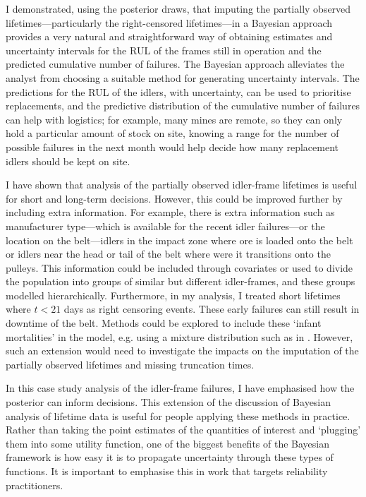 I demonstrated, using the posterior draws, that imputing the partially observed lifetimes---particularly the right-censored lifetimes---in a Bayesian approach provides a very natural and straightforward way of obtaining estimates and uncertainty intervals for the RUL of the frames still in operation and the predicted cumulative number of failures. The Bayesian approach alleviates the analyst from choosing a suitable method for generating uncertainty intervals. The predictions for the RUL of the idlers, with uncertainty, can be used to prioritise replacements, and the predictive distribution of the cumulative number of failures can help with logistics; for example, many mines are remote, so they can only hold a particular amount of stock on site, knowing a range for the number of possible failures in the next month would help decide how many replacement idlers should be kept on site.

I have shown that analysis of the partially observed idler-frame lifetimes is useful for short and long-term decisions. However, this could be improved further by including extra information. For example, there is extra information such as manufacturer type---which is available for the recent idler failures---or the location on the belt---idlers in the impact zone where ore is loaded onto the belt or idlers near the head or tail of the belt where were it transitions onto the pulleys. This information could be included through covariates or used to divide the population into groups of similar but different idler-frames, and these groups modelled hierarchically. Furthermore, in my analysis, I treated short lifetimes where $t < 21$ days as right censoring events. These early failures can still result in downtime of the belt. Methods could be explored to include these `infant mortalities' in the model, e.g. using a mixture distribution such as in \citep{mittman2013}. However, such an extension would need to investigate the impacts on the imputation of the partially observed lifetimes and missing truncation times.

In this case study analysis of the idler-frame failures, I have emphasised how the posterior can inform decisions. This extension of the discussion of Bayesian analysis of lifetime data is useful for people applying these methods in practice. Rather than taking the point estimates of the quantities of interest and `plugging' them into some utility function, one of the biggest benefits of the Bayesian framework is how easy it is to propagate uncertainty through these types of functions. It is important to emphasise this in work that targets reliability practitioners.